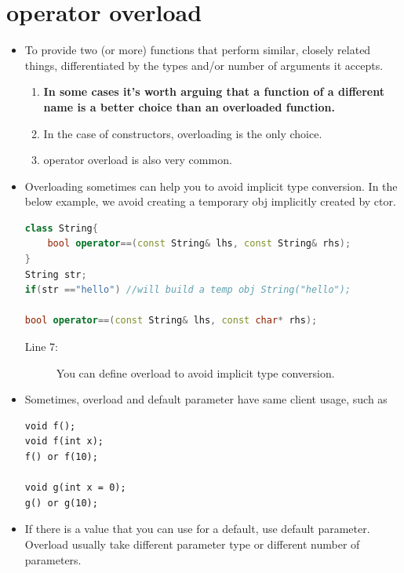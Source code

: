 \documentclass[a4paper,11pt,twoside]{book}
\begin{document}
\section{operator overload}
\begin{itemize}
	
 
	\item To provide two (or more) functions that perform similar, closely related things, differentiated by the types and/or number of arguments it accepts.
	
	\begin{enumerate}
		\item \textbf{In some cases it's worth arguing that a function of a different name is a better choice than an overloaded function.}
		
		\item  In the case of constructors, overloading is the only choice.
		
		\item  operator overload is also very common.
	\end{enumerate}


	
	\item Overloading sometimes can help you to avoid implicit type conversion. In the below example, we avoid creating a temporary obj implicitly created by ctor.
	
\begin{lstlisting}[frame=single, language=c++]
class String{
	bool operator==(const String& lhs, const String& rhs);
}
String str;
if(str =="hello") //will build a temp obj String("hello");
	
bool operator==(const String& lhs, const char* rhs);
\end{lstlisting}
\begin{description}
	\item[Line 7:] You can define overload to avoid implicit type conversion.
\end{description}

	
	\item Sometimes, overload and default parameter have same client usage, such as
\begin{lstlisting}[numbers=none]
void f();
void f(int x);
f() or f(10);
	
void g(int x = 0);
g() or g(10);
\end{lstlisting}
	
	\item If there is a value that you can use for a default, use default parameter. Overload usually take different parameter type or different number of parameters.
	

\end{itemize}
\end{document}
